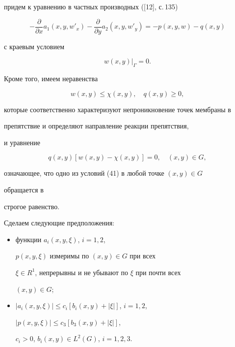 придем к уравнению в частных производных ([12], с.\,135)


\begin{equation}\label {39}


-\frac{\partial }{\partial x}a_1(x,y,w'_x)-\frac{\partial }{\partial


y}a_2(x,y,


w'_y)=-p(x,y,w)-q(x,y)


\end{equation}


с краевым условием


\begin{equation}\label {40}


w(x,y)|_{\Gamma }=0.


\end{equation}


Кроме того, имеем неравенства


\begin{equation}\label {41}


w(x,y) \leq \chi (x,y),\quad q(x,y)\geq 0,


\end{equation}


которые соответственно характеризуют непроникновение точек мембраны в


препятствие и определяют направление реакции препятствия,


и уравнение


\begin{equation}\label {42}


q(x,y)[w(x,y)-\chi(x,y)]=0,\quad (x,y) \in G,


\end{equation}


означающее, что одно из условий (41) в любой точке $(x,y) \in G$


обращается в


строгое равенство.





Сделаем следующие предположения:


\begin{itemize}


\item[1)] функции $a_i(x,y,\xi)$, $i=1,2$,


$p(x,y,\xi)$ измеримы по $(x,y)\in G$ при всех


$\xi \in R^1$, непрерывны и не убывают по $\xi$ при почти всех


$(x,y)\in G$;


\item[2)] $| a_i(x,y,\xi )| \leq c_i[b_i(x,y)+| \xi | ]$, $i=1,2$,


$|p(x,y,\xi )| \leq c_3[b_3(x,y)+| \xi | ]$,


$c_i >0$, $b_i(x,y)\in L^2(G)$, $i=1,2,3$.


\end{itemize}


